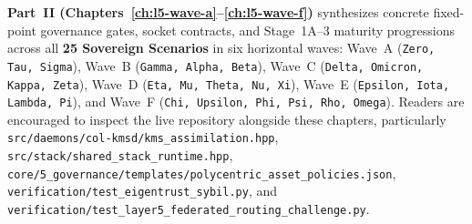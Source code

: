 \textbf{Part~II (Chapters~\ref{ch:l5-wave-a}--\ref{ch:l5-wave-f})} synthesizes concrete
fixed-point governance gates, socket contracts, and Stage~1A--3 maturity progressions across all
\textbf{25 Sovereign Scenarios} in six horizontal waves: Wave~A (\texttt{Zero, Tau, Sigma}),
Wave~B (\texttt{Gamma, Alpha, Beta}), Wave~C (\texttt{Delta, Omicron, Kappa, Zeta}), Wave~D
(\texttt{Eta, Mu, Theta, Nu, Xi}), Wave~E (\texttt{Epsilon, Iota, Lambda, Pi}), and Wave~F
(\texttt{Chi, Upsilon, Phi, Psi, Rho, Omega}). Readers are encouraged to inspect the live
repository alongside these chapters, particularly \texttt{src/daemons/col-kmsd/kms\_assimilation.hpp},
\texttt{src/stack/shared\_stack\_runtime.hpp}, \texttt{core/5\_governance/templates/polycentric\_asset\_policies.json},
\texttt{verification/test\_eigentrust\_sybil.py}, and \texttt{verification/test\_layer5\_federated\_routing\_challenge.py}.
